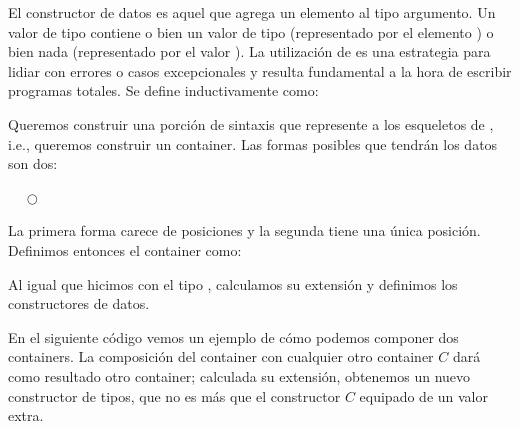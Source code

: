 
\begin{example} El constructor de datos  es aquel que agrega un elemento al tipo argumento.
Un valor de tipo   contiene o bien un valor  de tipo  (representado por el elemento   ) o bien nada (representado por el valor ). La utilización de  es una estrategia para lidiar con errores o casos excepcionales y resulta fundamental a la hora de escribir programas totales. 
  Se define inductivamente como:
  

  Queremos construir una porción de sintaxis que represente a los esqueletos de , i.e., queremos construir un container. Las formas posibles que tendrán los datos son dos:

  \begin{center}
   $\quad$ $\bigcirc$
  \end{center}
  
  La primera forma carece de posiciones y la segunda tiene una única posición. Definimos entonces el container  como:


  Al igual que hicimos con el tipo , calculamos su extensión y definimos los constructores de datos.

\end{example}
\vspace{2ex}



\begin{example}\label{ex:cont:comp} 
  En el siguiente código vemos un ejemplo de cómo podemos componer dos containers. La composición del container  con cualquier otro container $C$ dará como resultado otro container; calculada su extensión, obtenemos un nuevo constructor de tipos, que no es más que el constructor $C$ equipado de un valor extra. 

  
\end{example}
\vspace{2ex}




